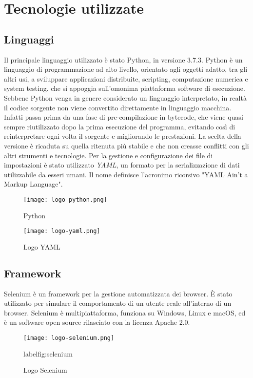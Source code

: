 \section{Tecnologie utilizzate}

\subsection{Linguaggi}
Il principale linguaggio utilizzato è stato Python, in versione 3.7.3. Python è un linguaggio di programmazione ad alto livello, orientato agli oggetti adatto, tra gli altri usi, a sviluppare applicazioni distribuite, scripting, computazione numerica e system testing.  che si appoggia sull’omonima piattaforma software di esecuzione. Sebbene Python venga in genere considerato un linguaggio interpretato, in realtà il codice sorgente non viene convertito direttamente in linguaggio macchina. Infatti passa prima da una fase di pre-compilazione in bytecode, che viene quasi sempre riutilizzato dopo la prima esecuzione del programma, evitando così di reinterpretare ogni volta il sorgente e migliorando le prestazioni. La scelta della versione è ricaduta su quella ritenuta più stabile e che non creasse conflitti con gli altri strumenti e tecnologie.\newline{}
Per la gestione e configurazione dei file di impostazioni è stato utilizzato \textit{YAML}, un formato per la serializzazione di dati utilizzabile da esseri umani. Il nome definisce l'acronimo ricorsivo "YAML Ain't a Markup Language".

\begin{figure}[!h]
    \begin{minipage}{.5\textwidth} 
        \centering 
        \texttt{[image: logo-python.png]} 
        \caption{Python} 
        \label{fig:python} 
    \end{minipage}%
    \begin{minipage}{.5\textwidth} 
        \centering 
        \texttt{[image: logo-yaml.png]} 
        \caption{Logo YAML} 
        \label{fig:yaml} 
    \end{minipage}%
\end{figure}


\subsection{Framework}

Selenium è un framework per la gestione automatizzata dei browser. È stato utilizzato per simulare il comportamento di un utente reale all'interno di un browser. Selenium è multipiattaforma, funziona su Windows, Linux e macOS, ed è un software open source rilasciato con la licenza Apache 2.0.

\begin{figure}[!h] 
    \centering 
    \texttt{[image: logo-selenium.png]} 
    \caption{Logo Selenium}
    label{fig:selenium} 
\end{figure}

